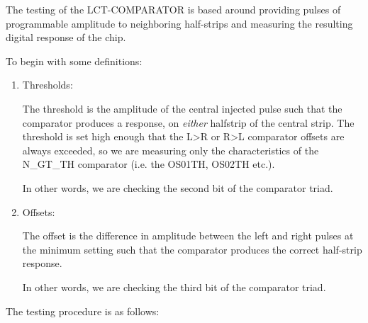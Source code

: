 \documentclass[letterpaper]{article}
\begin{document}
The testing of the LCT-COMPARATOR is based around providing pulses of programmable amplitude to neighboring half-strips and measuring the resulting digital response of the chip.

To begin with some definitions:

\begin{enumerate}

\item Thresholds:

The threshold is the amplitude of the central injected pulse such that the
comparator produces a response, on \textit{either} halfstrip of the central
strip. The threshold is set high enough that the L>R or R>L comparator offsets
are always exceeded, so we are measuring only the characteristics of the
N\_GT\_TH comparator (i.e. the OS01TH, OS02TH etc.).

In other words, we are checking the second bit of the comparator triad.

\item Offsets:

The offset is the difference in amplitude between the left and right
pulses at the minimum setting such that the comparator produces the
correct half-strip response.

In other words, we are checking the third bit of the comparator triad.

\end{enumerate}

The testing procedure is as follows:
\end{document}
